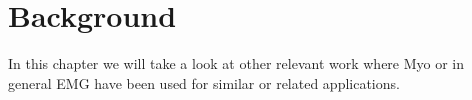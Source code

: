 \chapter{Background}
In this chapter we will take a look at other relevant work where Myo or in general EMG have been used for similar or related applications.
